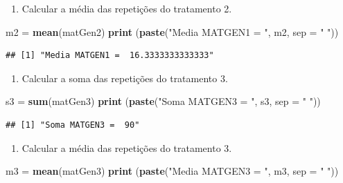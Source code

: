 \documentclass[
]{article}
\newenvironment{Shaded}{\begin{snugshade}}{\end{snugshade}}
\newcommand{\DataTypeTok}[1]{\textcolor[rgb]{0.13,0.29,0.53}{#1}}
\newcommand{\KeywordTok}[1]{\textcolor[rgb]{0.13,0.29,0.53}{\textbf{#1}}}
\newcommand{\NormalTok}[1]{#1}
\newcommand{\StringTok}[1]{\textcolor[rgb]{0.31,0.60,0.02}{#1}}
\providecommand{\tightlist}{%
  \setlength{\itemsep}{0pt}\setlength{\parskip}{0pt}}
\begin{document}
\begin{enumerate}
\def\labelenumi{\arabic{enumi}.}
\setcounter{enumi}{4}
\tightlist
\item
  Calcular a média das repetições do tratamento 2.
\end{enumerate}

\begin{Shaded}
\begin{Highlighting}[]
\NormalTok{m2 =}\StringTok{ }\KeywordTok{mean}\NormalTok{(matGen2)}
\KeywordTok{print}\NormalTok{ (}\KeywordTok{paste}\NormalTok{(}\StringTok{"Media MATGEN1 = "}\NormalTok{, m2, }\DataTypeTok{sep =} \StringTok{" "}\NormalTok{))}
\end{Highlighting}
\end{Shaded}

\begin{verbatim}
## [1] "Media MATGEN1 =  16.3333333333333"
\end{verbatim}

\begin{enumerate}
\def\labelenumi{\arabic{enumi}.}
\setcounter{enumi}{5}
\tightlist
\item
  Calcular a soma das repetições do tratamento 3.
\end{enumerate}

\begin{Shaded}
\begin{Highlighting}[]
\NormalTok{s3 =}\StringTok{ }\KeywordTok{sum}\NormalTok{(matGen3)}
\KeywordTok{print}\NormalTok{ (}\KeywordTok{paste}\NormalTok{(}\StringTok{"Soma MATGEN3 = "}\NormalTok{, s3, }\DataTypeTok{sep =} \StringTok{" "}\NormalTok{))}
\end{Highlighting}
\end{Shaded}

\begin{verbatim}
## [1] "Soma MATGEN3 =  90"
\end{verbatim}

\begin{enumerate}
\def\labelenumi{\arabic{enumi}.}
\setcounter{enumi}{6}
\tightlist
\item
  Calcular a média das repetições do tratamento 3.
\end{enumerate}

\begin{Shaded}
\begin{Highlighting}[]
\NormalTok{m3 =}\StringTok{ }\KeywordTok{mean}\NormalTok{(matGen3)}
\KeywordTok{print}\NormalTok{ (}\KeywordTok{paste}\NormalTok{(}\StringTok{"Media MATGEN3 = "}\NormalTok{, m3, }\DataTypeTok{sep =} \StringTok{" "}\NormalTok{))}
\end{Highlighting}
\end{Shaded}
\end{document}
